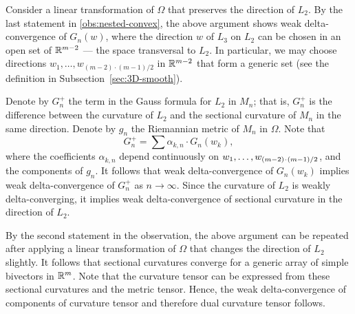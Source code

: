 Consider a linear transformation of $\Omega$ that preserves the direction of $L_2$.
By the last statement in \ref{obs:nested-convex},
the above argument shows weak delta-convergence of $G_n(w)$, where the direction $w$ of $L_3$ on $L_2$ can be chosen in an open set of $\mathbb{R}^{m-2}$ --- the space transversal to $L_2$.
In particular, we may choose directions $w_1,\dots, w_{(m-2)\cdot(m-1)/2}$ in $\mathbb{R}^{m-2}$ that form a generic set (see the  definition in Subsection~\ref{sec:3D-smooth}).

Denote by $G_n^+$ the term in the Gauss formula for $L_2$ in $M_n$;
that is, $G_n^+$ is the difference between the curvature of $L_2$ and the sectional curvature of $M_n$ in the same direction.
Denote by $g_n$ the Riemannian metric of $M_n$ in $\Omega$.
Note that 
\[G_n^+=\sum\alpha_{k,n}\cdot G_n(w_k),\]
where the coefficients $\alpha_{k,n}$ depend continuously on $w_1,\zz\dots, w_{(m-2)\cdot(m-1)/2}$, and the components of $g_n$. 
It follows that weak delta-convergence of $G_n(w_k)$ implies weak delta-convergence of $G_n^+$ as $n\to\infty$.
Since the curvature of $L_2$ is weakly delta-converging, it implies weak delta-convergence of sectional curvature in the direction of $L_2$.

By the second statement in the observation,
the above argument can be repeated after applying a linear transformation of $\Omega$ that changes the direction of $L_2$ slightly.
It follows that sectional curvatures converge for a generic array of simple bivectors in $\mathbb{R}^m$.
Note that the curvature tensor can be expressed from these sectional curvatures and the metric tensor.
Hence, the weak delta-convergence of components of curvature tensor and therefore dual curvature tensor follows.
\qeds

